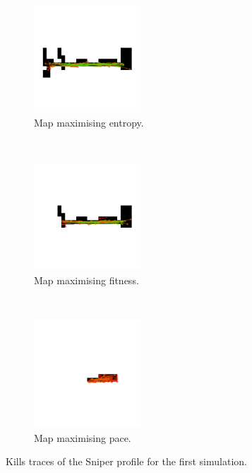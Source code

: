 \begin{figure}[H]
    \centering
    \begin{subfigure}[t]{0.3\textwidth}
        \centering
        \includegraphics[height=4.0cm]{Images/images/experiment_one/best_entropy_pop_0/kill_traces_bot_1.png}
        \caption{Map maximising entropy.}
    \end{subfigure}%
    ~ 
    \begin{subfigure}[t]{0.3\textwidth}
        \centering
        \includegraphics[height=4.0cm]{Images/images/experiment_one/best_fitness_pop_0/kill_traces_bot_1.png}
        \caption{Map maximising fitness.}
    \end{subfigure}
    ~ 
    \begin{subfigure}[t]{0.3\textwidth}
        \centering
        \includegraphics[height=4.0cm]{Images/images/experiment_one/best_pace_pop_0/kill_traces_bot_1.png}
        \caption{Map maximising pace.}
    \end{subfigure}
    \caption{Kills traces of the Sniper profile for the first simulation.}
\end{figure}

\newpage

